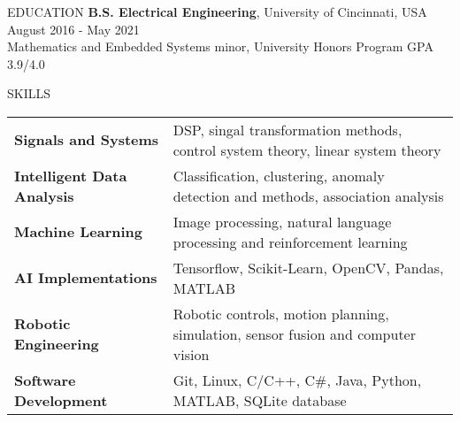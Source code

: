 \documentclass{../lib/resume} %
\begin{document}

\begin{rSection}{EDUCATION}
    {\bf B.S. Electrical Engineering}, University of Cincinnati, USA \hfill {August 2016 - May 2021}\\
    Mathematics and Embedded Systems minor, University Honors Program \hfill {GPA 3.9/4.0}



\end{rSection}

\begin{rSection}{SKILLS}

    \begin{tabular}{ @{} >{\bfseries}l @{\hspace{2ex}} l }
        Signals and Systems       & DSP, singal transformation methods, control system theory, linear system theory  \\
        Intelligent Data Analysis & Classification, clustering, anomaly detection and methods, association analysis  \\
        Machine Learning          & Image processing, natural language processing and reinforcement learning         \\
        AI Implementations        & Tensorflow, Scikit-Learn, OpenCV, Pandas, MATLAB                                 \\
        Robotic Engineering       & Robotic controls, motion planning, simulation, sensor fusion and computer vision \\
        Software Development      & Git, Linux, C/C++, C\#, Java, Python, MATLAB, SQLite database                                \\
    \end{tabular}
\end{rSection}
\end{document}
